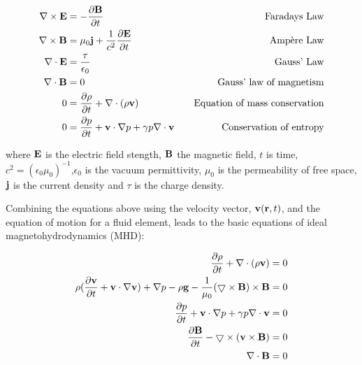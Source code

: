 \begin{align}
	\nabla \times \mathbf{E} &= -\frac{\partial \mathbf{B}}{\partial t }  &\quad \textnormal{Faradays Law}\\
	\nabla \times \mathbf{B} &= \mu_0\mathbf{j} + \frac{1}{c^2}\frac{\partial \mathbf{E}}{\partial t } &\quad \textnormal{Amp{\`e}re Law}\\
	\nabla\cdot\mathbf{E} &= \frac{\tau}{\epsilon_0} &\quad \textnormal{Gauss' Law}\\
	\nabla\cdot\mathbf{B} &= 0 & \quad \textnormal{Gauss' law of magnetism}\\
	0 &= \frac{\partial \rho}{\partial t } + \nabla \cdot (\rho\mathbf{v}) & \quad\textnormal{Equation of mass conservation}\\
	0 &= \frac{\partial p}{\partial t } + \mathbf{v}\cdot\nabla p + \gamma p\nabla\cdot\mathbf{v} & \quad \textnormal{Conservation of entropy}
\end{align}

\noindent where $\mathbf{E}$ is the electric field stength, $\mathbf{B}$ the magnetic field, $t$ is time, $c^2 = (\epsilon_0\mu_0)^{-1}$,$\epsilon_0$ is the vacuum permittivity, $\mu_0$ is the permeability of free space, $\mathbf{j}$ is the current density and $\tau$ is the charge density.


Combining the equations above using the velocity vector, $\mathbf{v}(\mathbf{r},t)$, and the equation of motion for a fluid element, leads to the basic equations of ideal magnetohydrodynamics (MHD):

\begin{align}
	\frac{\partial \rho}{\partial t } + \nabla\cdot(\rho\mathbf{v}) &= 0 \\
	\rho(\frac{\partial \mathbf{v}}{\partial t } + \mathbf{v}\cdot\nabla\mathbf{v}) + \nabla p - \rho\mathbf{g} - \frac{1}{\mu_0}(\bigtriangledown \times \mathbf{B}) \times \mathbf{B} &= 0\\
	\frac{\partial p}{\partial t } + \mathbf{v}\cdot\nabla p + \gamma p\nabla\cdot\mathbf{v} &= 0\\
	\frac{\partial \mathbf{B}}{\partial t } - \bigtriangledown \times (\mathbf{v} \times \mathbf{B}) &= 0\\
	\nabla\cdot\mathbf{B} &= 0
\end{align}

